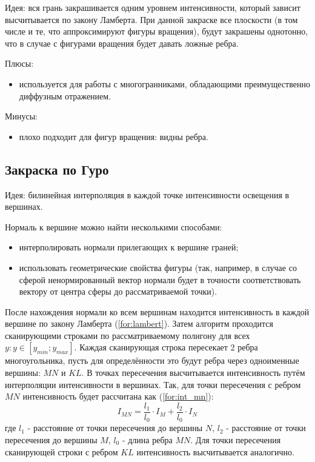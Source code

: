 Идея: вся грань закрашивается одним уровнем интенсивности, который зависит
высчитывается по закону Ламберта\cite{rogers}. При данной закраске все
плоскости (в том числе и те, что аппроксимируют фигуры вращения), будут
закрашены однотонно, что в случае с фигурами вращения будет давать ложные
ребра.

Плюсы:
\begin{itemize}
    \item используется для работы с многогранниками, обладающими преимущественно диффузным отражением.
\end{itemize}

Минусы:

\begin{itemize}
    \item плохо подходит для фигур вращения: видны ребра.
\end{itemize}

\subsection{Закраска по Гуро}
Идея: билинейная интерполяция в каждой точке интенсивности освещения в вершинах\cite{lmodels}.

Нормаль к вершине можно найти несколькими способами:
\begin{itemize}
    \item интерполировать нормали прилегающих к вершине граней;
    \item использовать геометрические свойства фигуры (так, например, в случае
        со сферой ненормированный вектор нормали будет в точности
        соответствовать вектору от центра сферы до рассматриваемой точки).
\end{itemize}

После нахождения нормали ко всем вершинам находится интенсивность в каждой
вершине по закону Ламберта (\ref{for:lambert}).  Затем алгоритм проходится
сканирующими строками по рассматриваемому полигону для всех $y: y \in [y_{min};
y_{max}]$. Каждая сканирующая строка пересекает 2 ребра многоугольника, пусть
для определённости это будут ребра через одноименные вершины: $MN$ и $KL$. В
точках пересечения высчитывается интенсивность путём интерполяции интенсивности
в вершинах. Так, для точки пересечения с ребром $MN$ интенсивность будет
рассчитана как (\ref{for:int_mn}):
\begin{equation}
    \label{for:int_mn}
    I_{MN} = \frac{l_1}{l_0} \cdot I_M + \frac{l_2}{l_0} \cdot I_N
\end{equation}
где $l_1$ - расстояние от точки пересечения до вершины $N$, $l_2$ - расстояние
от точки пересечения до вершины $M$, $l_0$ - длина ребра $MN$.  Для точки
пересечения сканирующей строки с ребром $KL$ интенсивность высчитывается
аналогично.


